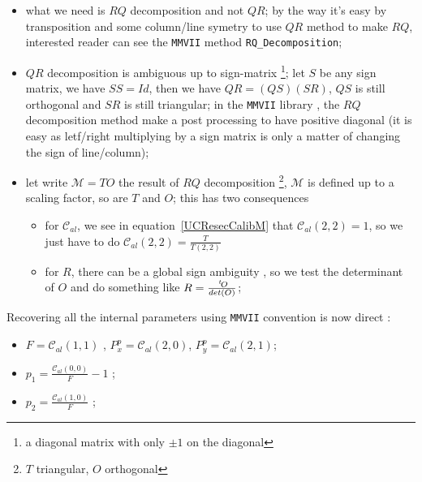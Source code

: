 \begin{itemize}
    \item what we need is $RQ$ decomposition and not $QR$; by the way it's easy
          by transposition and some column/line symetry to use $QR$ method to make $RQ$,
          interested reader can see the {\tt MMVII} method {\tt RQ\_Decomposition};

    \item $QR$ decomposition is ambiguous up to sign-matrix \footnote{a diagonal
          matrix with only $\pm 1$ on the diagonal}; let $S$ be any sign matrix, we have $SS=Id$,
          then we have $QR=(QS)(SR)$, $QS$ is still orthogonal and $SR$ is still triangular;
          in the {\tt MMVII} library , the $RQ$ decomposition method make a post processing
          to have positive diagonal (it is easy as letf/right multiplying by a sign matrix is only 
          a matter of changing the sign of line/column);
          
    \item let write $\mathcal{M} = T O $ the result of $RQ$ decomposition \footnote{$T$ triangular,
          $O$ orthogonal},  $\mathcal{M} $ is defined up to a scaling factor, so are $T$ and $O$;  this has two
          consequences

          \begin{itemize}
                \item for $\mathcal{C}_{al} $, we see in equation~\ref{UCResecCalibM} that
                     $\mathcal{C}_{al}(2,2)=1$, so  we just have to do
                     $\mathcal{C}_{al}(2,2) = \frac{T}{T(2,2)}$

                \item for $R$, there can be a global sign ambiguity , so we test the determinant of
                      $O$ and do something like $R=\frac{\; ^{t} \! O}{det(O)}$;
          \end{itemize}

\end{itemize}

Recovering all the internal parameters using {\tt MMVII} convention  is now direct :

\begin{itemize}
    \item  $F=\mathcal{C}_{al}(1,1)$ , $P^p_x=\mathcal{C}_{al}(2,0)$,  $P^p_y=\mathcal{C}_{al}(2,1)$;
    \item  $p_1=\frac{\mathcal{C}_{al}(0,0)}{F}-1$ ;
    \item  $p_2=\frac{\mathcal{C}_{al}(1,0)}{F}$ ;
\end{itemize}





